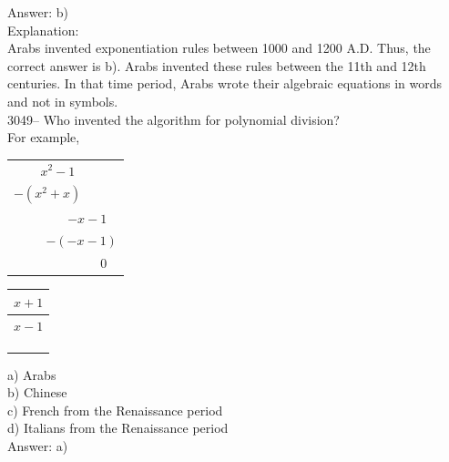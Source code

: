 \documentclass[letterpaper, 12pt]{article}
\begin{document}
Answer: b)\\

Explanation:\\
Arabs invented exponentiation rules between 1000 and 1200 A.D. Thus, the correct answer is b). Arabs invented these rules between the 11th and 12th centuries. In that time period, Arabs wrote their algebraic equations in words and not in symbols.\\



3049-- Who invented the algorithm for polynomial division?\\
For example,
\begin{center}
\begin{tabular}{r}
$x^{2} - 1$ \ \ \ \ \ \ \\
\underline{$- (x^{2} + x)$} \ \ \ \  \ \\
$- x - 1$ \ \\
\underline{$- (-x - 1)$}\\
$0$ \
\end{tabular}
\begin{tabular}{|c}
$x + 1$ \\ \hline
$x - 1$\\
\\
\\
\\
\end{tabular}
\end{center}

a) Arabs\\
b) Chinese\\
c) French from the Renaissance period\\
d) Italians from the Renaissance period\\

Answer: a)\\
\end{document}
